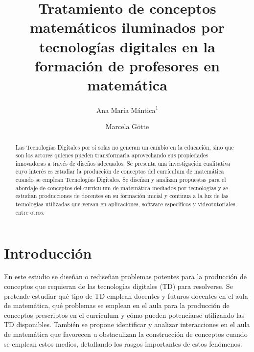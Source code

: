 \documentclass[oneside,spanish]{amsart}
\numberwithin{equation}{section}
\numberwithin{figure}{section}
\theoremstyle{definition}
\begin{document}
	
\title[Tratamiento de conceptos matemáticos iluminados por tecnologías digitales en la formación de profesores en matemática]{Tratamiento de conceptos matemáticos iluminados por tecnologías digitales en la formación de profesores en matemática\vspace{-2ex}}
\author[1]{Ana María Mántica\textsuperscript{1}}
\author[2]{Marcela Götte}

\begin{abstract}
	Las Tecnologías Digitales por si solas no generan un cambio en la educación, sino que son los actores quienes pueden transformarla aprovechando sus propiedades innovadoras a través de diseños adecuados. Se presenta una investigación cualitativa cuyo interés es estudiar la producción de conceptos del currículum de matemática cuando se emplean Tecnologías Digitales. Se diseñan y analizan propuestas para el abordaje de conceptos del currículum de matemática mediados por tecnologías y se estudian producciones de docentes en su formación inicial y continua a la luz de las tecnologías utilizadas que versan en aplicaciones, software específicos y videotutoriales, entre otros.  
\end{abstract}

\maketitle
\thispagestyle{empty}

\section{Introducción}

En este estudio se diseñan o rediseñan problemas potentes para la producción de conceptos que requieran de las tecnologías digitales (TD) para resolverse. Se pretende estudiar qué tipo de TD emplean docentes y futuros docentes en el aula de matemática, qué problemas se emplean en el aula para la producción de conceptos prescriptos en el currículum y cómo pueden potenciarse utilizando las TD disponibles. También se propone identificar y analizar interacciones en el aula de matemática que favorecen u obstaculizan la construcción de conceptos cuando se emplean estos medios, detallando los rasgos importantes de estos fenómenos. 
\end{document}

